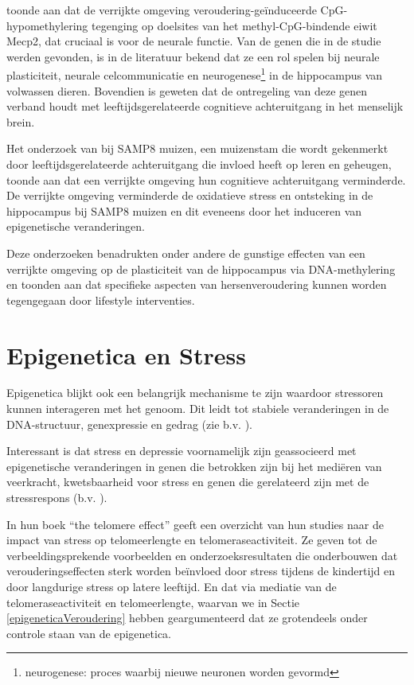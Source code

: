 \documentclass[
  11pt,
]{book}
\begin{document}
\citet{zocher2021} toonde aan dat de verrijkte omgeving veroudering-geïnduceerde CpG-hypomethylering tegenging op doelsites van het methyl-CpG-bindende eiwit Mecp2, dat cruciaal is voor de neurale functie. Van de genen die in de studie werden gevonden, is in de literatuur bekend dat ze een rol spelen bij neurale plasticiteit, neurale celcommunicatie en neurogenese\footnote{neurogenese: proces waarbij nieuwe neuronen worden gevormd} in de hippocampus van volwassen dieren. Bovendien is geweten dat de ontregeling van deze genen verband houdt met leeftijdsgerelateerde cognitieve achteruitgang in het menselijk brein.

Het onderzoek van \citet{grinan2016} bij SAMP8 muizen, een muizenstam die wordt gekenmerkt door leeftijdsgerelateerde achteruitgang die invloed heeft op leren en geheugen, toonde aan dat een verrijkte omgeving hun cognitieve achteruitgang verminderde. De verrijkte omgeving verminderde de oxidatieve stress en ontsteking in de hippocampus bij SAMP8 muizen en dit eveneens door het induceren van epigenetische veranderingen.

Deze onderzoeken benadrukten onder andere de gunstige effecten van een verrijkte omgeving op de plasticiteit van de hippocampus via DNA-methylering en toonden aan dat specifieke aspecten van hersenveroudering kunnen worden tegengegaan door lifestyle interventies.

\hypertarget{epigenetica-en-stress}{%
\section{Epigenetica en Stress}\label{epigenetica-en-stress}}

Epigenetica blijkt ook een belangrijk mechanisme te zijn waardoor stressoren kunnen interageren met het genoom. Dit leidt tot stabiele veranderingen in de DNA-structuur, genexpressie en gedrag (zie b.v. \citet{Park2019}).

Interessant is dat stress en depressie voornamelijk zijn geassocieerd met epigenetische veranderingen in genen die betrokken zijn bij het mediëren van veerkracht, kwetsbaarheid voor stress en genen die gerelateerd zijn met de stressrespons (b.v. \citet{Park2019}).

In hun boek ``the telomere effect'' geeft \citet{BlackburnEpel2017} een overzicht van hun studies naar de impact van stress op telomeerlengte en telomeraseactiviteit. Ze geven tot de verbeeldingsprekende voorbeelden en onderzoeksresultaten die onderbouwen dat verouderingseffecten sterk worden beïnvloed door stress tijdens de kindertijd en door langdurige stress op latere leeftijd. En dat via mediatie van de telomeraseactiviteit en telomeerlengte, waarvan we in Sectie \ref{epigeneticaVeroudering} hebben geargumenteerd dat ze grotendeels onder controle staan van de epigenetica.
\end{document}

